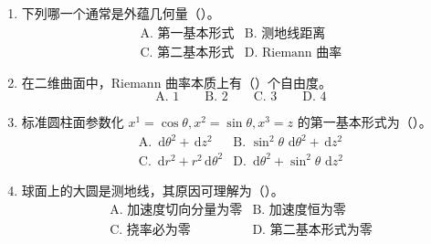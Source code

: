 \documentclass[UTF8,12pt,a4paper]{ctexart}
\newcommand{\dd}{\,\mathrm d}
\begin{document}
\begin{enumerate}
\item 下列哪一个通常是外蕴几何量（\quad）。
\[
\begin{array}{ll}
\text{A. 第一基本形式} & \text{B. 测地线距离}\\
\text{C. 第二基本形式} & \text{D. Riemann 曲率}
\end{array}
\]

\item 在二维曲面中，Riemann 曲率本质上有（\quad）个自由度。
\[
\text{A. 1}\qquad \text{B. 2}\qquad \text{C. 3}\qquad \text{D. 4}
\]

\item 标准圆柱面参数化 $x^1=\cos\theta,x^2=\sin\theta,x^3=z$ 的第一基本形式为（\quad）。
\[
\begin{array}{ll}
\text{A. }\dd\theta^2+\dd z^2 &
\text{B. }\sin^2\theta\,\dd\theta^2+\dd z^2\\
\text{C. }\dd r^2+r^2\dd\theta^2 &
\text{D. }\dd\theta^2+\sin^2\theta\,\dd z^2
\end{array}
\]

\item 球面上的大圆是测地线，其原因可理解为（\quad）。
\[
\begin{array}{ll}
\text{A. 加速度切向分量为零} & \text{B. 加速度恒为零}\\
\text{C. 挠率必为零} & \text{D. 第二基本形式为零}
\end{array}
\]
\end{enumerate}
\end{document}
